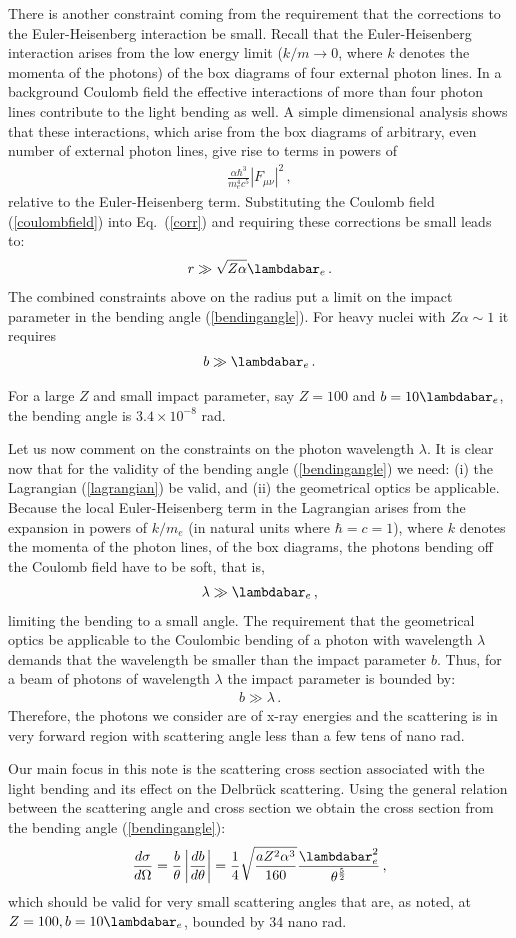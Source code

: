 \documentclass[aps,tightenlines,preprint]{revtex4-1}
\newcommand{\bear}{\begin{eqnarray}}
\newcommand{\eear}{\end{eqnarray}}
\begin{document}
  
There is another constraint coming from the requirement that 
the corrections 
to the Euler-Heisenberg interaction be small.
Recall that 
the Euler-Heisenberg interaction arises from the low energy limit 
($k/m\to 0$, where $k$ denotes the momenta of the photons)
of the box 
diagrams of four external  photon lines. In a background 
Coulomb field the effective interactions of more than four 
photon lines  contribute to the light bending as well.
A simple  dimensional analysis shows that these interactions,  
which arise from the
 box diagrams of arbitrary, even number of external 
 photon lines, give rise to 
 terms
in powers of 
\bear{}
\frac{\alpha\hbar^{3}}{m_{e}^{4}c^{5}}
 |F_{\mu\nu}|^{2}\,,{}
 \label{corr}
\eear{}
relative to the Euler-Heisenberg term.
Substituting  the Coulomb field (\ref{coulombfield}) 
into Eq.~(\ref{corr}) and requiring these
 corrections  be 
 small leads to: 
\bear{}
r\gg \sqrt{Z\alpha}\lambdabar_{e}\,.
\label{const3}
\eear{}
The combined constraints above on the radius put a
 limit on the impact parameter
in the bending angle  (\ref{bendingangle}).
For heavy nuclei with $Z\alpha\sim 1$ it requires
\bear{}
b\gg \lambdabar_{e}\,.{}
\label{b-constraint}
\eear{}

 For a large $Z$ and
   small impact parameter, say $Z=100$ and $b=10\lambdabar_{e}$,
    the bending angle is $3.4 \times 
10^{-8} $ rad. 

Let us now comment on the constraints on the photon wavelength $\lambda$.  
It is clear now that for the validity of the
bending angle (\ref{bendingangle}) we need: (i) the Lagrangian 
(\ref{lagrangian}) be valid, and (ii) the geometrical optics  be 
applicable. Because the local Euler-Heisenberg term in the Lagrangian
 arises from the expansion 
in powers of $k/m_{e}$ (in natural units where $\hbar=c=1$), 
where $k$ denotes the momenta of the photon
lines, of the box diagrams, the photons bending off the Coulomb field
have to be soft, that is,
\bear{}
\lambda \gg \lambdabar_{e}\,,
\eear{}
limiting the bending to a small angle. 
The requirement that the geometrical optics be applicable to the
Coulombic bending of a photon with wavelength $\lambda$ demands that
the wavelength be smaller than the impact parameter $b$. Thus, for
a beam of photons of wavelength $\lambda$ the impact parameter is bounded
by:
\bear 
b\gg \lambda{}\,.
\eear{}
Therefore, the photons we consider are of x-ray energies and the scattering is
in very forward region with scattering angle less than a few tens of nano rad.


Our main focus in this note is the scattering cross section 
associated with the light bending and its effect on the
Delbr{\"u}ck scattering.
Using the general relation between the scattering angle and
 cross section \cite{goldstein}
 we obtain the cross section from the
bending angle (\ref{bendingangle}):
\bear{} 
\frac{d\sigma}{d\Omega} 
=\frac{b}{\theta}\left|\frac{db}{d\theta}\right| 
=\frac{1}{4}\sqrt{\frac{a Z^2\alpha^3}{160}} 
\frac{\lambdabar_e^2}{\theta^{\frac{5}{2}}}\,,
\label{cross}
\eear 
which should be  valid for very small scattering angles that are, as noted, at
 $Z=100, b=10\lambdabar_{e}$,  bounded by 34 nano rad.
\end{document}
